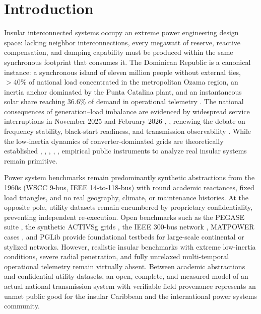 \section{Introduction}
\label{sec:intro}

Insular interconnected systems occupy an extreme power engineering design space: lacking neighbor interconnections, every megawatt of reserve, reactive compensation, and damping capability must be produced within the same synchronous footprint that consumes it. The Dominican Republic is a canonical instance: a synchronous island of eleven million people without external ties, $>40\%$ of national load concentrated in the metropolitan Ozama region, an inertia anchor dominated by the Punta Catalina plant, and an instantaneous solar share reaching 36.6\% of demand in operational telemetry \cite{ocseni}. The national consequences of generation--load imbalance are evidenced by widespread service interruptions in November 2025 and February 2026 \cite{ocseni}, \cite{listin2025}, renewing the debate on frequency stability, black-start readiness, and transmission observability \cite{blackout2004}. While the low-inertia dynamics of converter-dominated grids are theoretically established \cite{kundur1994}, \cite{tielens2016}, \cite{milano2018}, \cite{dorfler2013}, \cite{hatziargyriou2021}, empirical public instruments to analyze real insular systems remain primitive.

Power system benchmarks remain predominantly synthetic abstractions from the 1960s (WSCC 9-bus, IEEE 14-to-118-bus) with round academic reactances, fixed load triangles, and no real geography, climate, or maintenance histories. At the opposite pole, utility datasets remain encumbered by proprietary confidentiality, preventing independent re-execution. Open benchmarks such as the PEGASE suite \cite{fliscounakis2013pegase}, the synthetic ACTIVSg grids \cite{birchfield2017activsg}, the IEEE 300-bus network \cite{ieee300bus}, MATPOWER cases \cite{matpower2011}, and PGLib \cite{pglib2019} provide foundational testbeds for large-scale continental or stylized networks. However, realistic insular benchmarks with extreme low-inertia conditions, severe radial penetration, and fully unrelaxed multi-temporal operational telemetry remain virtually absent. Between academic abstractions and confidential utility datasets, an open, complete, and measured model of an actual national transmission system with verifiable field provenance represents an unmet public good for the insular Caribbean and the international power systems community.

